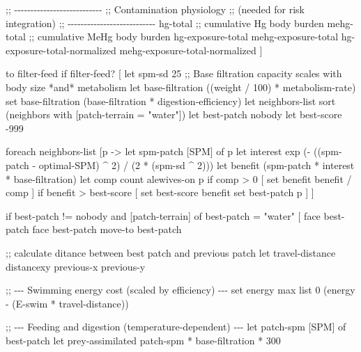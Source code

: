 \documentclass[
]{book}
\newenvironment{Shaded}{\begin{snugshade}}{\end{snugshade}}
\newcommand{\NormalTok}[1]{#1}
\begin{document}
\begin{Shaded}
\begin{Highlighting}[]
\NormalTok{  ;; {-}{-}{-}{-}{-}{-}{-}{-}{-}{-}{-}{-}{-}{-}{-}{-}{-}{-}{-}{-}{-}{-}{-}{-}{-}{-}{-}}
\NormalTok{  ;; Contamination physiology}
\NormalTok{  ;; (needed for risk integration)}
\NormalTok{  ;; {-}{-}{-}{-}{-}{-}{-}{-}{-}{-}{-}{-}{-}{-}{-}{-}{-}{-}{-}{-}{-}{-}{-}{-}{-}{-}{-}}
\NormalTok{  hg{-}total                      ;; cumulative Hg body burden}
\NormalTok{  mehg{-}total                    ;; cumulative MeHg body burden}
\NormalTok{  hg{-}exposure{-}total}
\NormalTok{  mehg{-}exposure{-}total}
\NormalTok{  hg{-}exposure{-}total{-}normalized}
\NormalTok{  mehg{-}exposure{-}total{-}normalized}
\NormalTok{]}

\NormalTok{to filter{-}feed}
\NormalTok{if filter{-}feed? [}
\NormalTok{  let spm{-}sd 25}
\NormalTok{  ;; Base filtration capacity scales with body size *and* metabolism}
\NormalTok{  let base{-}filtration ((weight / 100) * metabolism{-}rate)}
\NormalTok{  set base{-}filtration (base{-}filtration * digestion{-}efficiency)}
\NormalTok{  let neighbors{-}list sort (neighbors with [patch{-}terrain = "water"])}
\NormalTok{  let best{-}patch nobody}
\NormalTok{  let best{-}score {-}999}

\NormalTok{  foreach neighbors{-}list [p {-}\textgreater{}}
\NormalTok{    let spm{-}patch [SPM] of p}
\NormalTok{    let interest exp ({-} ((spm{-}patch {-} optimal{-}SPM) \^{} 2) / (2 * (spm{-}sd \^{} 2)))}
\NormalTok{    let benefit (spm{-}patch * interest * base{-}filtration)}
\NormalTok{    let comp count alewives{-}on p}
\NormalTok{    if comp \textgreater{} 0 [ set benefit benefit / comp ]}
\NormalTok{    if benefit \textgreater{} best{-}score [}
\NormalTok{      set best{-}score benefit}
\NormalTok{      set best{-}patch p}
\NormalTok{    ]}
\NormalTok{  ]}

\NormalTok{  if best{-}patch != nobody and [patch{-}terrain] of best{-}patch = "water" [}
\NormalTok{    face best{-}patch}
\NormalTok{    face best{-}patch}
\NormalTok{    move{-}to best{-}patch}
      
\NormalTok{    ;; calculate ditance between best patch and previous patch }
\NormalTok{    let travel{-}distance distancexy previous{-}x previous{-}y}
      
\NormalTok{    ;; {-}{-}{-} Swimming energy cost (scaled by efficiency) {-}{-}{-}}
\NormalTok{    set energy max list 0 (energy {-} (E{-}swim * travel{-}distance))}

\NormalTok{    ;; {-}{-}{-} Feeding and digestion (temperature{-}dependent) {-}{-}{-}}
\NormalTok{    let patch{-}spm [SPM] of best{-}patch}
\NormalTok{    let prey{-}assimilated patch{-}spm * base{-}filtration * 300}
      

\end{Highlighting}
\end{Shaded}
\end{document}

